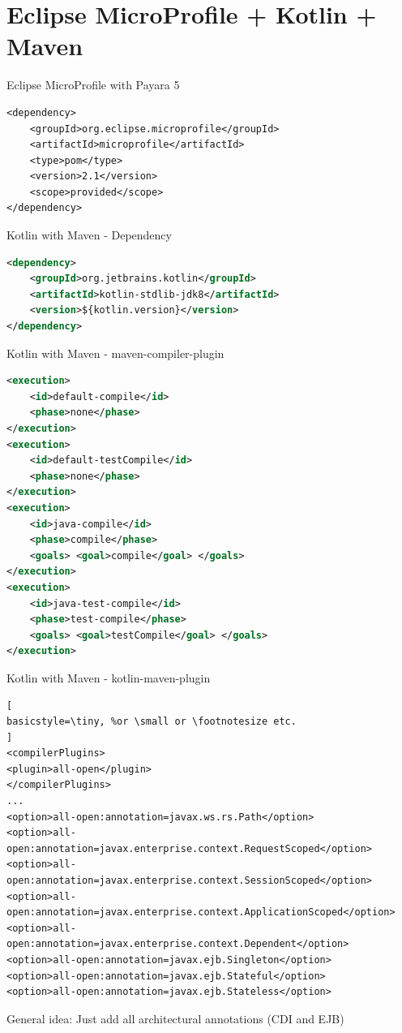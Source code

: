 \documentclass[aspectratio=169]{beamer}
\begin{document}
\section{Eclipse MicroProfile + Kotlin + Maven}

\begin{frame}[fragile]{Eclipse MicroProfile with Payara 5}
\begin{lstlisting}
<dependency>
	<groupId>org.eclipse.microprofile</groupId>
	<artifactId>microprofile</artifactId>
	<type>pom</type>
	<version>2.1</version>
	<scope>provided</scope>
</dependency>
\end{lstlisting}
\end{frame}


\begin{frame}[fragile]{Kotlin with Maven - Dependency}
\begin{lstlisting}[language=XML]
<dependency>
	<groupId>org.jetbrains.kotlin</groupId>
	<artifactId>kotlin-stdlib-jdk8</artifactId>
	<version>${kotlin.version}</version>
</dependency>
\end{lstlisting}
\end{frame}

\begin{frame}[fragile]{Kotlin with Maven - maven-compiler-plugin}
\begin{lstlisting}[language=xml,
basicstyle=\tiny, %or \small or \footnotesize etc.
]
<execution>
	<id>default-compile</id>
	<phase>none</phase>
</execution>
<execution>
	<id>default-testCompile</id>
	<phase>none</phase>
</execution>
<execution>
	<id>java-compile</id>
	<phase>compile</phase>
	<goals> <goal>compile</goal> </goals>
</execution>
<execution>
	<id>java-test-compile</id>
	<phase>test-compile</phase>
	<goals> <goal>testCompile</goal> </goals>
</execution>
\end{lstlisting}
\end{frame}


\begin{frame}[fragile]{Kotlin with Maven - kotlin-maven-plugin}
\begin{lstlisting}[
basicstyle=\tiny, %or \small or \footnotesize etc.
]
<compilerPlugins>
<plugin>all-open</plugin>
</compilerPlugins>
...
<option>all-open:annotation=javax.ws.rs.Path</option>
<option>all-open:annotation=javax.enterprise.context.RequestScoped</option>
<option>all-open:annotation=javax.enterprise.context.SessionScoped</option>
<option>all-open:annotation=javax.enterprise.context.ApplicationScoped</option>
<option>all-open:annotation=javax.enterprise.context.Dependent</option>
<option>all-open:annotation=javax.ejb.Singleton</option>
<option>all-open:annotation=javax.ejb.Stateful</option>
<option>all-open:annotation=javax.ejb.Stateless</option>
\end{lstlisting}

General idea: Just add all architectural annotations (CDI and EJB)
\end{frame}
\end{document}

